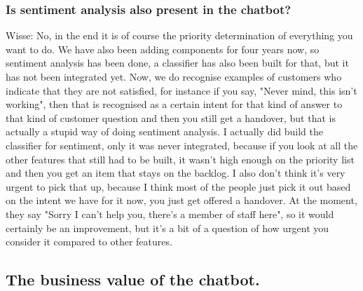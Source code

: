 \begin{appendices}
	\subsubsection{Is sentiment analysis also present in the chatbot?}
	Wisse: No, in the end it is of course the priority determination of everything you want to do. We have also been adding components for four years now, so sentiment analysis has been done, a classifier has also been built for that, but it has not been integrated yet. Now, we do recognise examples of customers who indicate that they are not satisfied, for instance if you say, "Never mind, this isn't working", then that is recognised as a certain intent for that kind of answer to that kind of customer question and then you still get a handover, but that is actually a stupid way of doing sentiment analysis. I actually did build the classifier for sentiment, only it was never integrated, because if you look at all the other features that still had to be built, it wasn't high enough on the priority list and then you get an item that stays on the backlog. I also don't think it's very urgent to pick that up, because I think most of the people just pick it out based on the intent we have for it now, you just get offered a handover. At the moment, they say "Sorry I can't help you, there's a member of staff here", so it would certainly be an improvement, but it's a bit of a question of how urgent you consider it compared to other features.
	
	\subsection{The business value of the chatbot.}

\end{appendices}
